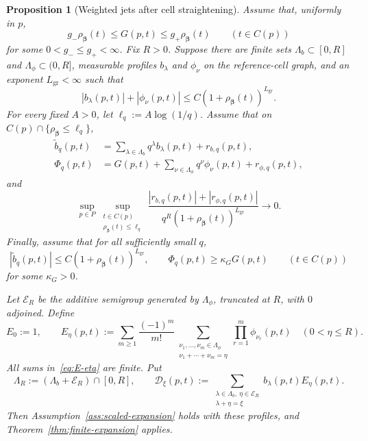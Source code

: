 \documentclass[11pt]{amsart}
\numberwithin{equation}{section}
\newtheorem{proposition}[theorem]{Proposition}
\theoremstyle{definition}
\theoremstyle{remark}
\newcommand{\cE}{\mathcal{E}}
\newcommand{\cD}{\mathcal{D}}
\begin{document}
\begin{proposition}[Weighted jets after cell straightening]
\label{prop:homogeneous-jets}
Assume that, uniformly in $p$,
\begin{equation}\label{eq:reference-cell-coercivity}
 g_-\rho_{\bm\beta}(t)\le G(p,t)\le g_+\rho_{\bm\beta}(t)
 \qquad(t\in C(p))
\end{equation}
for some $0<g_-\le g_+<\infty$.  Fix $R>0$.  Suppose there are finite sets
$\Lambda_b\subset[0,R]$ and $\Lambda_\phi\subset(0,R]$, measurable profiles
$b_\lambda$ and $\phi_\nu$ on the reference-cell graph, and an exponent
$L_{\mathrm{gr}}<\infty$ such that
\begin{equation}\label{eq:transported-profile-growth}
 |b_\lambda(p,t)|+|\phi_\nu(p,t)|
 \le C(1+\rho_{\bm\beta}(t))^{L_{\mathrm{gr}}}.
\end{equation}
For every fixed $A>0$, let $\ell_q:=A\log(1/q)$.  Assume that on
$C(p)\cap\{\rho_{\bm\beta}\le \ell_q\}$,
\begin{align}
 \widetilde b_q(p,t)&=\sum_{\lambda\in\Lambda_b}q^\lambda b_\lambda(p,t)
            +r_{b,q}(p,t),\label{eq:transported-b-jet}\\
 \Phi_q(p,t)&=G(p,t)+\sum_{\nu\in\Lambda_\phi}q^\nu
 \phi_\nu(p,t)+r_{\phi,q}(p,t),\label{eq:transported-phi-jet}
\end{align}
and
\begin{equation}\label{eq:transported-jet-remainders}
 \sup_{p\in P}\sup_{\substack{t\in C(p)\\
              \rho_{\bm\beta}(t)\le \ell_q}}
 \frac{|r_{b,q}(p,t)|+|r_{\phi,q}(p,t)|}
 {q^R(1+\rho_{\bm\beta}(t))^{L_{\mathrm{gr}}}}\longrightarrow0.
\end{equation}
Finally, assume that for all sufficiently small $q$,
\begin{equation}\label{eq:transported-global-bounds}
 |\widetilde b_q(p,t)|\le C(1+\rho_{\bm\beta}(t))^{L_{\mathrm{gr}}},
 \qquad
 \Phi_q(p,t)\ge\kappa_G G(p,t)
 \qquad(t\in C(p))
\end{equation}
for some $\kappa_G>0$.

Let $\cE_R$ be the additive semigroup generated by $\Lambda_\phi$, truncated
at $R$, with $0$ adjoined.  Define
\begin{equation}\label{eq:E-eta}
 E_0:=1,
 \qquad
 E_\eta(p,t):=
 \sum_{m\ge1}\frac{(-1)^m}{m!}
 \sum_{\substack{\nu_1,\ldots,\nu_m\in\Lambda_\phi\\
                  \nu_1+\cdots+\nu_m=\eta}}
 \prod_{r=1}^m\phi_{\nu_r}(p,t)
 \quad(0<\eta\le R).
\end{equation}
All sums in~\eqref{eq:E-eta} are finite.  Put
\begin{equation}\label{eq:D-xi-formula}
 \Lambda_R:=(\Lambda_b+\cE_R)\cap[0,R],
 \qquad
 \cD_\xi(p,t):=
 \sum_{\substack{\lambda\in\Lambda_b,\ \eta\in\cE_R\\
                  \lambda+\eta=\xi}}
 b_\lambda(p,t)E_\eta(p,t).
\end{equation}
Then Assumption~\ref{ass:scaled-expansion} holds with these profiles, and
Theorem~\ref{thm:finite-expansion} applies.
\end{proposition}
\end{document}
